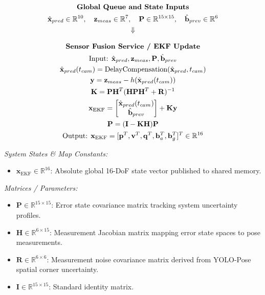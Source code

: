 \documentclass{article}
\begin{document}
\begin{tcolorbox}[colback=gray!5, colframe=black, arc=2mm, title=\textbf{Event-Driven EKF Update Thread ($T_3$) Architecture Stack}, center title]
\vspace{-0.5em}
$$
\begin{gathered}
    \text{\textbf{Global Queue and State Inputs}} \\
    \hat{\mathbf{x}}_{pred} \in \mathbb{R}^{10}, \quad \mathbf{z}_{meas} \in \mathbb{R}^7, \quad \mathbf{P} \in \mathbb{R}^{15 \times 15}, \quad \hat{\mathbf{b}}_{prev} \in \mathbb{R}^6 \\
    \Downarrow
\end{gathered}
$$

$$
\begin{gathered}
    \text{\textbf{Sensor Fusion Service / EKF Update}} \\
    \text{Input: } \hat{\mathbf{x}}_{pred}, \mathbf{z}_{meas}, \mathbf{P}, \hat{\mathbf{b}}_{prev} \\
    \hat{\mathbf{x}}_{pred}(t_{cam}) = \text{DelayCompensation}(\hat{\mathbf{x}}_{pred}, t_{cam}) \\
    \mathbf{y} = \mathbf{z}_{meas} - h(\hat{\mathbf{x}}_{pred}(t_{cam})) \\
    \mathbf{K} = \mathbf{P} \mathbf{H}^T (\mathbf{H} \mathbf{P} \mathbf{H}^T + \mathbf{R})^{-1} \\
    \mathbf{x}_{\text{EKF}} = \begin{bmatrix} \hat{\mathbf{x}}_{pred}(t_{cam}) \\ \hat{\mathbf{b}}_{prev} \end{bmatrix} + \mathbf{K} \mathbf{y} \\
    \mathbf{P} = (\mathbf{I} - \mathbf{K} \mathbf{H}) \mathbf{P} \\
    \text{Output: } \mathbf{x}_{\text{EKF}} = [\mathbf{p}^T, \mathbf{v}^T, \mathbf{q}^T, \mathbf{b}_a^T, \mathbf{b}_g^T]^T \in \mathbb{R}^{16}
\end{gathered}
$$
\end{tcolorbox}

\small
\noindent\textit{System States \& Map Constants:}
\begin{itemize}
    \item $\mathbf{x}_{\text{EKF}} \in \mathbb{R}^{16}$: Absolute global 16-DoF state vector published to shared memory.
\end{itemize}

\noindent\textit{Matrices / Parameters:}
\begin{itemize}
    \item $\mathbf{P} \in \mathbb{R}^{15 \times 15}$: Error state covariance matrix tracking system uncertainty profiles.
    \item $\mathbf{H} \in \mathbb{R}^{6 \times 15}$: Measurement Jacobian matrix mapping error state spaces to pose measurements.
    \item $\mathbf{R} \in \mathbb{R}^{6 \times 6}$: Measurement noise covariance matrix derived from YOLO-Pose spatial corner uncertainty.
    \item $\mathbf{I} \in \mathbb{R}^{15 \times 15}$: Standard identity matrix.
\end{itemize}
\end{document}
